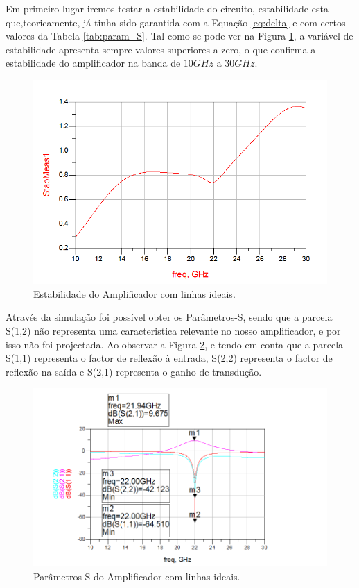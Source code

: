 \documentclass[11pt]{article}
\numberwithin{equation}{section}
\begin{document}
Em primeiro lugar iremos testar a estabilidade do circuito, estabilidade esta que,teoricamente, já tinha sido garantida com a Equação \ref{eq:delta} e com certos valores da Tabela \ref{tab:param_S}. Tal como se pode ver na Figura \ref{fig:ideal_estavel}, a variável de estabilidade apresenta sempre valores superiores a zero, o que confirma a estabilidade do amplificador na banda de $ 10 GHz $ a $ 30GHz $.

\begin{figure}[H]
	\centering
	\includegraphics[keepaspectratio=true, scale=0.45]{exps/Ideal_estab}
	\vspace{-0.5em}
	\caption{Estabilidade do Amplificador com linhas ideais.}
	\vspace{-0.8em}
	\label{fig:ideal_estavel}
\end{figure}

Através da simulação foi possível obter os Parâmetros-S, sendo que a parcela S(1,2) não representa uma caracteristica relevante no nosso amplificador, e por isso não foi projectada. Ao observar a Figura \ref{fig:ideal_S}, e tendo em conta que a parcela S(1,1) representa o factor de reflexão à entrada, S(2,2) representa o factor de reflexão na saída e S(2,1) representa o ganho de transdução.

\begin{figure}[H]
	\centering
	\includegraphics[keepaspectratio=true, scale=0.45]{exps/Ideal_S}
	\vspace{-0.5em}
	\caption{Parâmetros-S do Amplificador com linhas ideais.}
	\vspace{-0.8em}
	\label{fig:ideal_S}
\end{figure}
\end{document}
